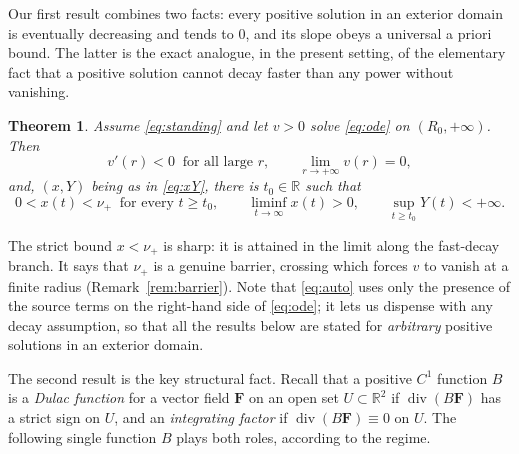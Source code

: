 \documentclass[11pt,reqno]{amsart}
\numberwithin{equation}{section}
\theoremstyle{plain}
\newtheorem{theorem}{Theorem}[section]
\theoremstyle{definition}
\newcommand{\R}{\mathbb{R}}
\DeclareMathOperator{\dv}{div}
\begin{document}
Our first result combines two facts: every positive solution in an exterior
domain is eventually decreasing and tends to $0$, and its slope obeys a
universal a priori bound. The latter is the exact analogue, in the present
setting, of the elementary fact that a positive solution cannot decay faster
than any power without vanishing.

\begin{theorem}\label{thm:apriori}
Assume \eqref{eq:standing} and let $v>0$ solve \eqref{eq:ode} on
$(R_{0},+\infty)$. Then
\begin{equation}\label{eq:auto}
v'(r)<0\ \text{ for all large }r,
\qquad
\lim_{r\to+\infty}v(r)=0 ,
\end{equation}
and, $(x,Y)$ being as in \eqref{eq:xY}, there is $t_{0}\in\R$ such that
\begin{equation}\label{eq:apriori}
0<x(t)<\nu_{+}\ \text{ for every }t\ge t_{0},
\qquad \liminf_{t\to\infty}x(t)>0,
\qquad \sup_{t\ge t_{0}}Y(t)<+\infty .
\end{equation}
\end{theorem}

The strict bound $x<\nu_{+}$ is sharp: it is attained in the limit along the
fast-decay branch. It says that $\nu_{+}$ is a genuine barrier, crossing which
forces $v$ to vanish at a finite radius (Remark~\ref{rem:barrier}). Note that \eqref{eq:auto} uses only
the presence of the source terms on the right-hand side of \eqref{eq:ode}; it
lets us dispense with any decay assumption, so that all the results below are
stated for \emph{arbitrary} positive solutions in an exterior domain.

The second result is the key structural fact. Recall that a positive $C^{1}$
function $B$ is a \emph{Dulac function} for a vector field $\mathbf F$ on an
open set $U\subset\R^{2}$ if $\dv(B\mathbf F)$ has a strict sign on $U$, and an
\emph{integrating factor} if $\dv(B\mathbf F)\equiv0$ on $U$. The following
single function $B$ plays both roles, according to the regime.
\end{document}
